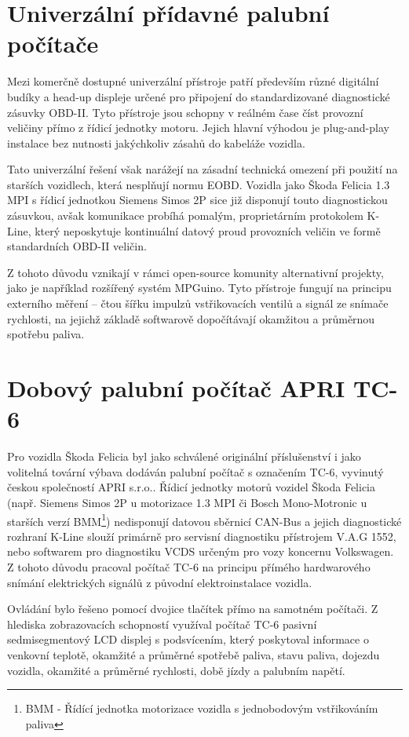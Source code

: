 \section{Univerzální přídavné palubní počítače}
Mezi komerčně dostupné univerzální přístroje patří především různé digitální budíky a head-up displeje určené pro připojení do standardizované diagnostické zásuvky OBD-II. 
Tyto přístroje jsou schopny v reálném čase číst provozní veličiny přímo z řídicí jednotky motoru. 
Jejich hlavní výhodou je plug-and-play instalace bez nutnosti jakýchkoliv zásahů do kabeláže vozidla.

Tato univerzální řešení však narážejí na zásadní technická omezení při použití na starších vozidlech, která nesplňují normu EOBD. 
Vozidla jako Škoda Felicia 1.3 MPI s řídicí jednotkou Siemens Simos 2P sice již disponují touto diagnostickou zásuvkou, avšak komunikace probíhá pomalým, 
proprietárním protokolem K-Line, který neposkytuje kontinuální datový proud provozních veličin ve formě standardních OBD-II veličin\cite{skoda_simos2p_1999}.

Z tohoto důvodu vznikají v rámci open-source komunity alternativní projekty, jako je například rozšířený systém MPGuino. 
Tyto přístroje fungují na principu externího měření – čtou šířku impulzů vstřikovacích ventilů a signál ze snímače rychlosti, na jejichž základě softwarově dopočítávají 
okamžitou a průměrnou spotřebu paliva.

\section{Dobový palubní počítač APRI TC-6}
Pro vozidla Škoda Felicia byl jako schválené originální příslušenství i jako volitelná tovární výbava dodáván palubní počítač s označením TC-6, 
vyvinutý českou společností APRI s.r.o..
Řídicí jednotky motorů vozidel Škoda Felicia (např. Siemens Simos 2P u motorizace 1.3 MPI či Bosch Mono-Motronic u 
starších verzí BMM\footnote{BMM - Řídící jednotka motorizace vozidla s jednobodovým vstřikováním paliva}) nedisponují datovou
sběrnicí CAN-Bus a jejich diagnostické rozhraní K-Line slouží primárně pro servisní diagnostiku přístrojem V.A.G 1552, nebo softwarem pro diagnostiku VCDS určeným pro vozy koncernu Volkswagen.
Z tohoto důvodu pracoval počítač TC-6 na principu přímého hardwarového snímání elektrických signálů z původní elektroinstalace vozidla\cite{skoda_simos2p_1999}.

Ovládání bylo řešeno pomocí dvojice tlačítek přímo na samotném počítači. Z hlediska zobrazovacích schopností využíval počítač TC-6 pasivní sedmisegmentový LCD displej s podsvícením,
který poskytoval informace o venkovní teplotě, okamžité a průměrné spotřebě paliva, stavu paliva, dojezdu vozidla, okamžité a průměrné rychlosti, době jízdy a palubním napětí.

